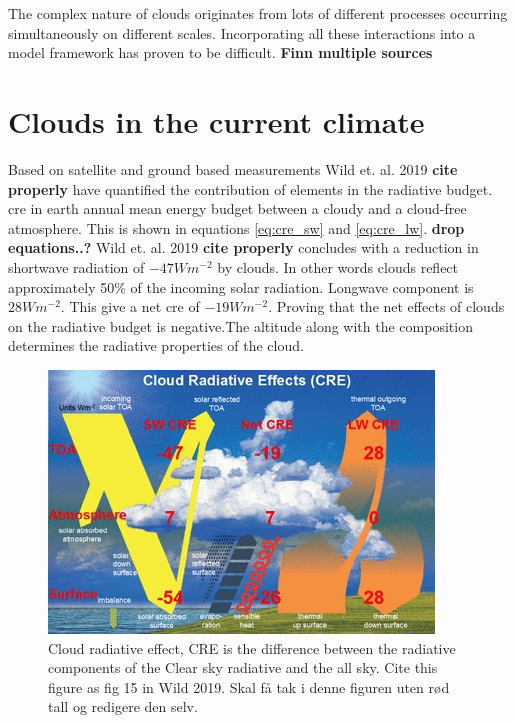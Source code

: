 \\ \\ 
The complex nature of clouds originates from lots of different processes occurring simultaneously on different scales. Incorporating all these interactions into a model framework has proven to be difficult. \textbf{Finn multiple sources} 

\section{Clouds in the current climate} \label{sec:intro_cloud_current_climate}

Based on satellite and ground based measurements Wild et. al. 2019 \textbf{cite properly} have quantified the contribution of elements in the radiative budget. \acrfull{cre} in earth annual mean energy budget between a cloudy and a cloud-free atmosphere. This is shown in equations \eqref{eq:cre_sw} and \eqref{eq:cre_lw}.  \textbf{drop equations..?}
Wild et. al. 2019 \textbf{cite properly} concludes with a reduction in shortwave radiation of $-47Wm^{-2}$ by clouds. In other words clouds reflect approximately 50\% of the incoming solar radiation. Longwave component is $28Wm^{-2}$. This give a net \acrshort{cre} of $-19Wm^{-2}$. Proving that the net effects of clouds on the radiative budget is negative.The altitude along with the composition determines the radiative properties of the cloud. 

\begin{figure}[h]
    \centering
    \includegraphics[scale = 7]{Chapter1_Intro/images/CRE_wild2019.jpg}
    \caption{Cloud radiative effect, CRE is the difference between the radiative components of the Clear sky radiative and the all sky. Cite this figure as fig 15 in Wild 2019. Skal få tak i denne figuren uten rød tall og redigere den selv.}
    \label{fig:cre}
\end{figure}

